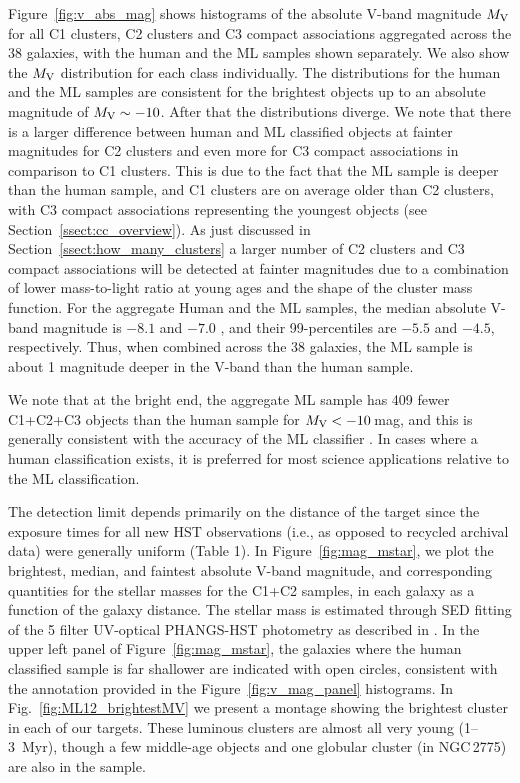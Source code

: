 \documentclass[]{aastex631}
\begin{document}
Figure~\ref{fig:v_abs_mag} shows histograms of the absolute V-band magnitude $M_{\rm V}$ for all C1 clusters, C2 clusters and C3 compact associations aggregated across the 38 galaxies, with the human and the ML samples shown separately. We also show the $M_{\rm V}$ distribution for each class individually. The distributions for the human and the ML samples are consistent for the brightest objects up to an absolute magnitude of $M_{\rm V} \sim -10$. After that the distributions diverge.
We note that there is a larger difference between human and ML classified objects at fainter magnitudes for C2 clusters and even more for C3 compact associations in comparison to C1 clusters. 
This is due to the fact that the ML sample is deeper than the human sample, and C1 clusters are on average older than C2 clusters, with C3 compact associations representing the youngest objects (see Section~\ref{ssect:cc_overview}). As just discussed in Section~\ref{ssect:how_many_clusters} a larger number of C2 clusters and C3 compact associations will be detected at fainter magnitudes due to a combination of lower mass-to-light ratio at young ages and the shape of the cluster mass function.
For the aggregate Human and the ML samples, the median absolute V-band magnitude is $-8.1$ and $-7.0$ , and their 99-percentiles are $-5.5$ and $-4.5$, respectively. Thus, when combined across the 38 galaxies, the ML sample is about 1 magnitude deeper in the V-band than the human sample.

We note that at the bright end, the aggregate ML sample has 409 fewer C1+C2+C3 objects than the human sample for $M_{\rm V} < -10$\,mag, and this is generally consistent with the accuracy of the ML classifier \citep{hannon_star_2023}.  In cases where a human classification exists, it is preferred for most science applications relative to the ML classification.

The detection limit depends primarily on the distance of the target since the exposure times for all new HST observations (i.e., as opposed to recycled archival data) were generally uniform (Table 1).  In Figure~\ref{fig:mag_mstar}, we plot the brightest, median, and faintest absolute V-band magnitude, and corresponding quantities for the stellar masses for the C1+C2 samples, in each galaxy as a function of the galaxy distance. The stellar mass is estimated through SED fitting of the 5 filter UV-optical PHANGS-HST photometry as described in \citet{thilker23sed}.
In the upper left panel of Figure~\ref{fig:mag_mstar}, the galaxies where the human classified sample is far shallower are indicated with open circles, consistent with the annotation provided in the Figure~\ref{fig:v_mag_panel} histograms. In Fig.~\ref{fig:ML12_brightestMV} we present a montage showing the brightest cluster in each of our targets.  These luminous clusters are almost all very young (1--3~Myr), though a few middle-age objects and one globular cluster (in NGC\,2775) are also in the sample.
\end{document}
